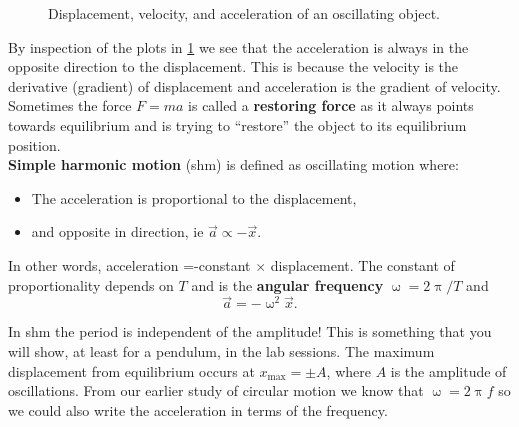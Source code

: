 \begin{figure}[ht]
    \centering
    \caption{Displacement, velocity, and acceleration of an oscillating object.}
        \label{fig: shm profile}
\end{figure}

By inspection of the plots in \cref{fig: shm profile} we see that the acceleration is always in the opposite direction to the displacement. This is because the velocity is the derivative (gradient) of displacement and acceleration is the gradient of velocity. Sometimes the force $F=ma$ is called a \textbf{restoring force} as it always points towards equilibrium and is trying to ``restore'' the object to its equilibrium position.\\

\textbf{Simple harmonic motion} (shm) is defined as oscillating motion where:
\begin{itemize}
\setlength{\itemsep}{-5pt}
    \item The acceleration is proportional to the displacement,
    \item and opposite in direction, ie $\vec{a}\propto -\vec{x}$.
\end{itemize} 
In other words, acceleration =-constant $\times$ displacement. The constant of proportionality depends on $T$ and is the \textbf{angular frequency} $\upomega=2\uppi/T$ and
\begin{equation}
\vec{a}=-\upomega^{2}\vec{x}.
\end{equation}

In shm the period is independent of the amplitude! This is something that you will show, at least for a pendulum, in the lab sessions. The maximum displacement from equilibrium occurs at $x_{\text{max}}=\pm A$, where $A$ is the amplitude of oscillations. From our earlier study of circular motion we know that $\upomega=2\uppi f$ so we could also write the acceleration in terms of the frequency.\\

